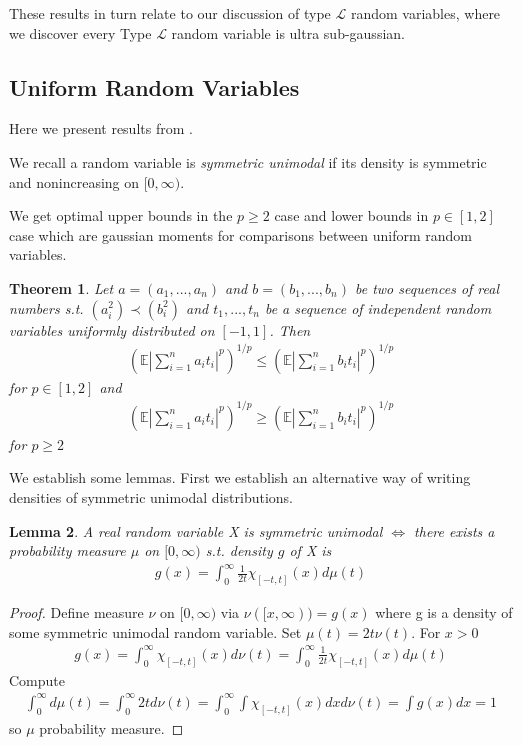 \documentclass[10pt]{article}
\newcommand{\E}{\mathbb{E}}
\newcommand{\1}{\textbf{1}}
\newtheorem{theorem}{Theorem}
\newtheorem{lemma}[theorem]{Lemma}
\theoremstyle{remark}
\theoremstyle{definition}
\begin{document}
These results in turn relate to our discussion of type $\mathcal{L}$ random variables, where we discover every Type $\mathcal{L}$ random variable is ultra sub-gaussian.


\subsection{Uniform Random Variables}

Here we present results from \cite{LO}. 


We recall a random variable is \textit{symmetric unimodal} if its density is symmetric and nonincreasing on $[0,\infty)$. 

We get optimal upper bounds in the $p \geq 2$ case and lower bounds in $p \in [1,2]$ case which are gaussian moments for comparisons between uniform random variables. 

\begin{theorem}
	Let $a = (a_1,...,a_n)$ and $b=(b_1,...,b_n)$ be two sequences of real numbers s.t. $(a_i^2) \prec (b_i^2)$ and $t_1,...,t_n$ be a sequence of independent random variables uniformly distributed on $[-1,1]$. Then
	\begin{align*}
		(\E |\sum_{i=1}^n a_it_i|^p)^{1/p}\leq (\E |\sum_{i=1}^nb_it_i|^p)^{1/p}
	\end{align*}
	for $p \in [1,2]$ and
	\begin{align*}
		(\E |\sum_{i=1}^n a_it_i|^p)^{1/p} \geq (\E |\sum_{i=1}^n b_it_i|^p)^{1/p}
	\end{align*}
	for $p \geq 2$
\end{theorem}

We establish some lemmas. First we establish an alternative way of writing densities of symmetric unimodal distributions.

\begin{lemma}
	A real random variable X is symmetric unimodal $\iff$ there exists a probability measure $\mu$ on $[0,\infty)$ s.t. density $g$ of X is 
	\begin{align*}
		g(x) = \int_0^{\infty}\frac{1}{2t}\chi_{[-t,t]}(x)d\mu(t)
	\end{align*}
\end{lemma}

\begin{proof}
	Define measure $\nu$ on $[0,\infty)$ via $\nu([x,\infty)) = g(x)$ where g is a density of some symmetric unimodal random variable. Set $\mu(t) = 2 t\nu(t)$. For $x > 0$
	\begin{align*}
		g(x) = \int_0^{\infty}\chi_{[-t,t]}(x) d\nu(t) = \int_0^{\infty} \frac{1}{2t}\chi_{[-t,t]}(x)d\mu(t)
	\end{align*}
	Compute
	\begin{align*}
		\int_0^{\infty}d\mu(t) = \int_0^{\infty} 2td\nu(t) = \int_0^{\infty} \int \chi_{[-t,t]}(x)dxd\nu(t) = \int g(x) dx = 1
	\end{align*}
	so $\mu$ probability measure.
\end{proof}
\end{document}
